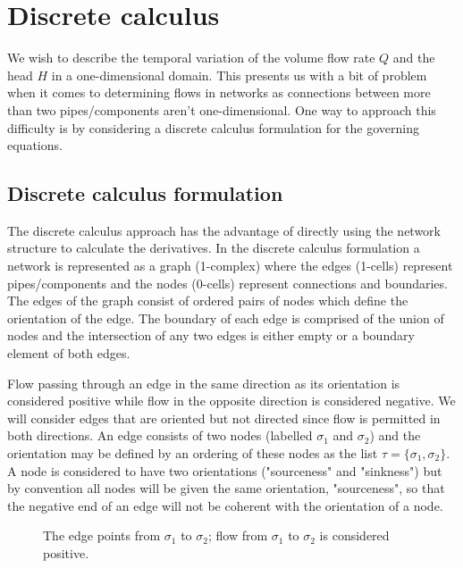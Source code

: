 
\section{Discrete calculus} \label{sec:discrete_calculus}

We wish to describe the temporal variation of the volume flow rate $Q$ and the head $H$ in a one-dimensional domain. This presents us with a bit of problem when it comes to determining flows in networks as connections between more than two pipes/components aren't one-dimensional. One way to approach this difficulty is by considering a discrete calculus \cite{grady10} formulation for the governing equations.

\subsection{Discrete calculus formulation}\label{subsec:discrete_calculus_steady}

The discrete calculus approach has the advantage of directly using the network structure to calculate the derivatives. In the discrete calculus formulation a network is represented as a graph (1-complex) where the edges (1-cells) represent pipes/components and the nodes (0-cells) represent connections and boundaries. The edges of the graph consist of ordered pairs of nodes which define the orientation of the edge. The boundary of each edge is comprised of the union of nodes and the intersection of any two edges is either empty or a boundary element of both edges. 

Flow passing through an edge in the same direction as its orientation is considered positive while flow in the opposite direction is considered negative. We will consider edges that are oriented but not directed since flow is permitted in both directions. An edge consists of two nodes (labelled $\sigma_1$ and $\sigma_2$) and the orientation may be defined by an ordering of these nodes as the list $\tau = \{ \sigma_1, \sigma_2 \}$. A node is considered to have two orientations ("sourceness" and "sinkness") but by convention all nodes will be given the same orientation, "sourceness", so that the negative end of an edge will not be coherent with the orientation of a node.   

\begin{figure}
\centering
{} 
\caption{The edge points from $\sigma_1$ to $\sigma_2$; flow from $\sigma_1$ to $\sigma_2$ is considered positive.}
\label{fig:edge_orientation}
\end{figure}

